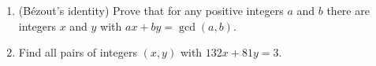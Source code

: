 \begin{enumerate}
\item[(a)] (B\'ezout's identity) Prove that for any positive integers $a$ and $b$ there are integers $x$ and $y$ with $ax+by=\gcd(a,b)$.
\item[(b)] Find all pairs of integers $(x,y)$ with $132x+81y=3$.
\end{enumerate}
